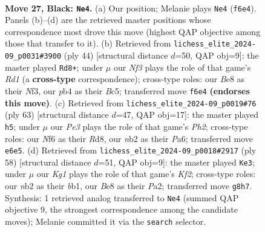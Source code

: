 \documentclass[11pt]{article}
\begin{document}
\clearpage

\begin{figure}[p]\centering
\begin{subfigure}{0.46\textwidth}\centering
\resizebox{\linewidth}{!}{%
\newchessgame
\chessboard[
  setfen={4b1k1/R4pp1/4pn2/1p5p/1P1P1P2/2r3PP/1N2P3/5BK1 b - - 0 27},
  showmover=false,
  pgfstyle=straightmove, color=movearrow, markmove={f6-e4}
]}
\caption{}
\end{subfigure}\hfill
\begin{subfigure}{0.46\textwidth}\centering
\resizebox{\linewidth}{!}{%
\newchessgame
\chessboard[
  setfen={6k1/6bp/b4pp1/2B2p2/p1p5/2P2N1P/PP2rPP1/3R2K1 w - - 2 23},
  showmover=false,
  pgfstyle=straightmove, color=movearrow, markmove={d1-d8}
]}
\caption{}
\end{subfigure}
\\[4pt]
\begin{subfigure}{0.46\textwidth}\centering
\resizebox{\linewidth}{!}{%
\newchessgame
\chessboard[
  setfen={3r2k1/N1R2p1p/pp3bp1/4np2/PP6/4P1P1/4KPBP/8 b - - 0 32},
  showmover=false,
  pgfstyle=straightmove, color=movearrow, markmove={h7-h5}
]}
\caption{}
\end{subfigure}\hfill
\begin{subfigure}{0.46\textwidth}\centering
\resizebox{\linewidth}{!}{%
\newchessgame
\chessboard[
  setfen={8/p2n1pkp/2p1p3/4P1p1/2P3N1/1B3P1P/P4KP1/1b6 w - - 4 30},
  showmover=false,
  pgfstyle=straightmove, color=movearrow, markmove={f2-e3}
]}
\caption{}
\end{subfigure}
\caption{\textbf{Move 27, Black: \texttt{Ne4}.} (a) Our position; Melanie plays \texttt{Ne4} (\texttt{f6e4}). Panels (b)--(d) are the retrieved master positions whose correspondence most drove this move (highest QAP objective among those that transfer to it). (b) Retrieved from \texttt{lichess\_elite\_2024-09\_p0031\#3900} (ply 44) [structural distance $d$=50, QAP obj=9]: the master played \texttt{Rd8+}; under $\mu$ our \emph{Nf3} plays the role of that game's \emph{Rd1} (a \textbf{cross-type} correspondence); cross-type roles: our \emph{B}e8 as their \emph{N}f3, our \emph{p}b4 as their \emph{B}c5; transferred move \texttt{f6e4} \textbf{(endorses this move)}. (c) Retrieved from \texttt{lichess\_elite\_2024-09\_p0019\#76} (ply 63) [structural distance $d$=47, QAP obj=17]: the master played \texttt{h5}; under $\mu$ our \emph{Pe3} plays the role of that game's \emph{Ph2}; cross-type roles: our \emph{N}f6 as their \emph{R}d8, our \emph{n}b2 as their \emph{P}a6; transferred move \texttt{e6e5}. (d) Retrieved from \texttt{lichess\_elite\_2024-09\_p0018\#2917} (ply 58) [structural distance $d$=51, QAP obj=9]: the master played \texttt{Ke3}; under $\mu$ our \emph{Kg1} plays the role of that game's \emph{Kf2}; cross-type roles: our \emph{n}b2 as their \emph{b}b1, our \emph{B}e8 as their \emph{P}a2; transferred move \texttt{g8h7}. Synthesis: 1 retrieved analog transferred to \texttt{Ne4} (summed QAP objective 9, the strongest correspondence among the candidate moves); Melanie committed it via the \texttt{search} selector.}
\label{fig:thought-m53}
\end{figure}
\end{document}
